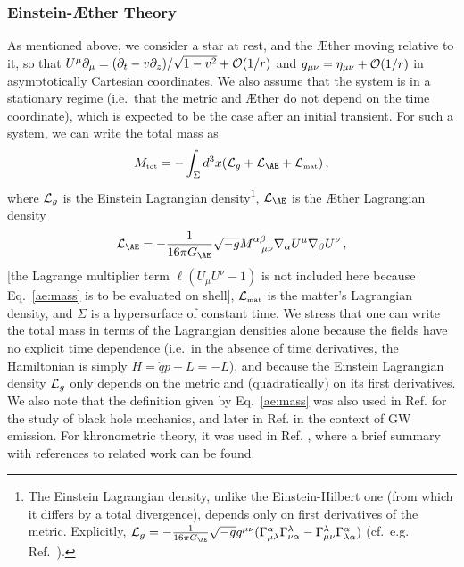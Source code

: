 \documentclass[prd,aps,twocolumn,nofootinbib,showpacs,superscriptaddress]{revtex4-1}
\newcommand{\tot}{{\mbox{\tiny tot}}}
\newcommand{\MAT}{{\mbox{\tiny mat}}}
\begin{document}
\subsubsection{Einstein-\AE ther Theory}

As mentioned above, we consider a star at rest, and the \AE ther moving relative to it, so that 
$U^{\mu}\partial_\mu=
(\partial_t-v \partial_z)/\sqrt{1-v^2} +{\cal O}(1/r)$ and
$g_{\mu\nu}=\eta_{\mu\nu}+{\cal O}(1/r)$ in asymptotically Cartesian coordinates. We also assume that
the system is in a stationary regime (i.e.~that the metric and \AE ther do not depend on the time coordinate), which
is expected to be the case after an initial transient. For such a system, we can write the total mass
as~\cite{damour_esposito_farese}
\begin{equation}\label{ae:mass}
M_{\tot}=-\int_\Sigma d^3 x ({\cal L}_{g}+{\cal L}_{\AE}+{\cal L}_{\MAT})\,,
\end{equation}
where ${\cal L}_{g}$ is the Einstein Lagrangian density\footnote{The Einstein Lagrangian
  density, unlike the Einstein-Hilbert one (from which it differs
  by a total divergence), depends only on first derivatives of the
  metric. Explicitly, ${\cal L}_{g}=-\frac{1}{16 \pi G_{\AE}}\sqrt{-g} g^{\mu\nu}
  (\Gamma^\alpha_{\mu\lambda}\Gamma^{\lambda}_{\nu\alpha}-\Gamma^\lambda_{\mu\nu}\Gamma^\alpha_{\lambda\alpha})$
  (cf.~e.g. Ref.~\cite{landau}).},  
${\cal L}_{\AE}$ is the \AE ther Lagrangian density
  \begin{equation}
{\cal L}_{\AE}= -\frac{1}{16 \pi G_{\AE}}\sqrt{-g}
M^{\alpha\beta}_{\phantom{ab}{\mu\nu}} \nabla_\alpha U^\mu\nabla_\beta
U^\nu\,,
\end{equation}
[the Lagrange multiplier term $\ell (U_\mu U^\nu-1)$ is not included
here because Eq.~\eqref{ae:mass} is to be evaluated on shell],
  ${\cal L}_{\MAT}$
is the matter's Lagrangian density,
and $\Sigma$ is a hypersurface of constant time.
We stress that one can write the total mass in terms of the Lagrangian densities alone because
the fields have no explicit time dependence (i.e.~in the absence of time derivatives, the Hamiltonian is simply $H=\dot{q} p -L =-L$),
and because the Einstein Lagrangian density ${\cal L}_{g}$
only depends on the metric and (quadratically) on its first derivatives.
We also note that the definition given by Eq.~\eqref{ae:mass}
was also used in Ref. \cite{Foster:2005fr} for the study of black hole mechanics, and 
later in Ref. \cite{Foster:2006az} in the context of GW emission. 
For khronometric theory, it
was used in Ref. \cite{Blas:2011zd}, where a brief summary with references to related work can be found.
\end{document}
